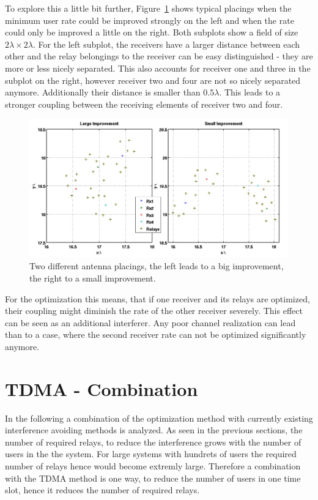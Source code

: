 To explore this a little bit further, Figure~\ref{fig:4user_placing} shows typical placings when the minimum user rate could be improved strongly on the left and when the rate could only be improved a little on the right.
Both subplots show a field of size $2\lambda \times 2\lambda$.
For the left subplot, the receivers have a larger distance between each other and the relay belongings to the receiver can be easy distinguished - they are more or less nicely separated.
This also accounts for receiver one and three in the subplot on the right, however receiver two and four are not so nicely separated anymore.
Additionally their distance is smaller than $0.5\lambda$.
This leads to a stronger coupling between the receiving elements of receiver two and four.
\begin{figure}[h]
\centering
  \includegraphics[width=0.8\linewidth]{images/Antenna_placing_4user.png}
\caption{Two different antenna placings, the left leads to a big improvement, the right to a small improvement.}
\label{fig:4user_placing}
\end{figure}

For the optimization this means, that if one receiver and its relays are optimized, their coupling might diminish the rate of the other receiver severely.
This effect can be seen as an additional interferer.
Any poor channel realization can lead than to a case, where the second receiver rate can not be optimized significantly anymore.


\section{TDMA - Combination}
\label{sec:tdma_combination}
In the following a combination of the optimization method with currently existing interference avoiding methods is analyzed.
As seen in the previous sections, the number of required relays, to reduce the interference grows with the number of users in the the system.
For large systems with hundrets of users the required number of relays hence would become extremly large.
Therefore a combination with the TDMA method is one way, to reduce the number of users in one time slot, hence it reduces the number of required relays.

